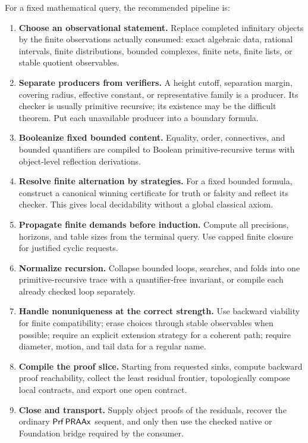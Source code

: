 For a fixed mathematical query, the recommended pipeline is:
\begin{enumerate}[label=\textbf{P\arabic*.},leftmargin=4.1em]
  \item \textbf{Choose an observational statement.}  Replace completed infinitary objects by the finite observations actually consumed: exact algebraic data, rational intervals, finite distributions, bounded complexes, finite nets, finite lists, or stable quotient observables.
  \item \textbf{Separate producers from verifiers.}  A height cutoff, separation margin, covering radius, effective constant, or representative family is a producer.  Its checker is usually primitive recursive; its existence may be the difficult theorem.  Put each unavailable producer into a boundary formula.
  \item \textbf{Booleanize fixed bounded content.}  Equality, order, connectives, and bounded quantifiers are compiled to Boolean primitive-recursive terms with object-level reflection derivations.
  \item \textbf{Resolve finite alternation by strategies.}  For a fixed bounded formula, construct a canonical winning certificate for truth or falsity and reflect its checker.  This gives local decidability without a global classical axiom.
  \item \textbf{Propagate finite demands before induction.}  Compute all precisions, horizons, and table sizes from the terminal query.  Use capped finite closure for justified cyclic requests.
  \item \textbf{Normalize recursion.}  Collapse bounded loops, searches, and folds into one primitive-recursive trace with a quantifier-free invariant, or compile each already checked loop separately.
  \item \textbf{Handle nonuniqueness at the correct strength.}  Use backward viability for finite compatibility; erase choices through stable observables when possible; require an explicit extension strategy for a coherent path; require diameter, motion, and tail data for a regular name.
  \item \textbf{Compile the proof slice.}  Starting from requested sinks, compute backward proof reachability, collect the least residual frontier, topologically compose local contracts, and export one open contract.
  \item \textbf{Close and transport.}  Supply object proofs of the residuals, recover the ordinary \(\mathsf{Prf}\,\mathsf{PRAAx}\) sequent, and only then use the checked native or Foundation bridge required by the consumer.
\end{enumerate}

